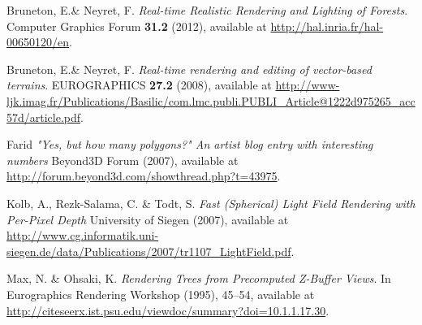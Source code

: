 \documentclass{article}
\begin{document}
\begin{thebibliography}{9}

  Bruneton, E.\& Neyret, F.
  \emph{Real-time Realistic Rendering and Lighting of Forests}.
  Computer Graphics Forum \textbf{31.2} (2012), available at
  \url{http://hal.inria.fr/hal-00650120/en}.

  Bruneton, E.\& Neyret, F.
  \emph{Real-time rendering and editing of vector-based terrains}.
  EUROGRAPHICS \textbf{27.2} (2008), available at
  \url{http://www-ljk.imag.fr/Publications/Basilic/com.lmc.publi.PUBLI_Article@1222d975265_acc57d/article.pdf}.

  Farid
  \emph{"Yes, but how many polygons?" An artist blog entry with interesting numbers}
  Beyond3D Forum (2007), available at
  \url{http://forum.beyond3d.com/showthread.php?t=43975}.

  Kolb, A., Rezk-Salama, C. \& Todt, S.
  \emph{Fast (Spherical) Light Field Rendering with Per-Pixel Depth}
  University of Siegen (2007), available at
  \url{http://www.cg.informatik.uni-siegen.de/data/Publications/2007/tr1107_LightField.pdf}.

  Max, N. \& Ohsaki, K.
  \emph{Rendering Trees from Precomputed Z-Buffer Views}.
  In Eurographics Rendering Workshop (1995), 45--54, available at
  \url{http://citeseerx.ist.psu.edu/viewdoc/summary?doi=10.1.1.17.30}.

\end{thebibliography}
\end{document}
